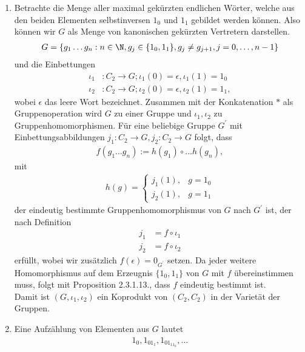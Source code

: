 \begin{solution}
\begin{enumerate}
  \item Betrachte die Menge aller maximal gekürzten endlichen Wörter, welche aus den beiden
  Elementen selbstinversen $1_0$ und $1_1$ gebildet werden können.
  Also können wir $G$ als Menge von kanonischen gekürzten Vertretern darstellen.
  \begin{align*}
  G = \{g_1\dots g_n: n \in \N, g_j \in\{1_0,1_1\}, g_j \neq g_{j+1}, j = 0,\dots,n-1\}
  \end{align*}
  und die Einbettungen
  \begin{align*}
    \iota_1&: C_2 \to G; \iota_1(0) = \epsilon, \iota_1(1) = 1_0 \\
    \iota_2&: C_2 \to G; \iota_2(0) = \epsilon, \iota_2(1) = 1_1,
  \end{align*}
  wobei $\epsilon$ das leere Wort bezeichnet.
  Zusammen mit der Konkatenation $*$ als Gruppenoperation wird $G$ zu einer Gruppe
  und $\iota_1,\iota_2$ zu Gruppenhomomorphismen.
  Für eine beliebige Gruppe $G^{\prime}$ mit Einbettungsabbildungen $j_1: C_2 \to G,
  j_2: C_2 \to G$ folgt, dass
  \begin{align*}
    f(g_1\dots g_n) := h(g_1)\circ\dots h(g_n),
  \end{align*}
  mit
  \begin{align*}
    h(g) = \begin{cases}
      j_1(1), & g = 1_0 \\
      j_2(1), & g = 1_1
    \end{cases}
  \end{align*}
  der eindeutig bestimmte Gruppenhomomorphismus von $G$ nach $G^{\prime}$
  ist, der nach Definition
  \begin{align*}
    j_1 &= f \circ \iota_1 \\
    j_2 &= f \circ \iota_2
  \end{align*}
  erfüllt, wobei wir zusätzlich $f(\epsilon) = 0_{G^\prime}$ setzen.
  Da jeder weitere Homomorphismus auf dem Erzeugnis $\{1_0,1_1\}$ von $G$
  mit $f$ übereinstimmen muss, folgt mit Proposition 2.3.1.13., dass
  $f$ eindeutig bestimmt ist. \\
  Damit ist $(G,\iota_1,\iota_2)$ ein Koprodukt von $(C_2,C_2)$ in der Varietät
  der Gruppen.
  \item Eine Aufzählung von Elementen aus $G$ lautet
  \begin{align*}
    1_0,1_01_1,1_01_11_0,\dots
  \end{align*}

\end{enumerate}
\end{solution}
